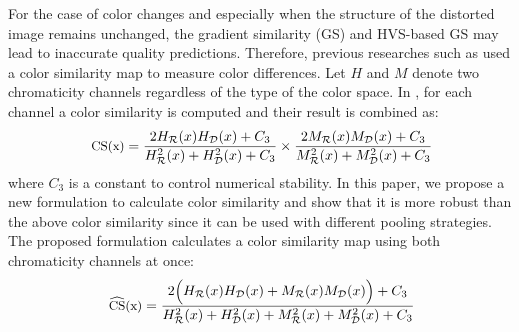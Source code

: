 For the case of color changes and especially when the structure of the distorted image remains unchanged, the gradient similarity (GS) and HVS-based GS may lead to inaccurate quality predictions. Therefore, previous researches such as \cite{FSIM, VSI} used a color similarity map to measure color differences. Let $H$ and $M$ denote two chromaticity channels regardless of the type of the color space. In \cite{FSIM, VSI}, for each channel a color similarity is computed and their result is combined as:
\begin{equation}
\small
  \ \text{CS(x)}=\frac{2 H_\mathcal{R}(x) H_\mathcal{D}(x) + C_3} {H_\mathcal{R}^2(x) + H_\mathcal{D}^2(x) + C_3} \times \frac{2 M_\mathcal{R}(x) M_\mathcal{D}(x) + C_3} {M_\mathcal{R}^2(x) + M_\mathcal{D}^2(x) + C_3}
  \label{CS}
\end{equation}                    
where $C_3$ is a constant to control numerical stability. In this paper, we propose a new formulation to calculate color similarity and show that it is more robust than the above color similarity since it can be used with different pooling strategies. The proposed formulation calculates a color similarity map using both chromaticity channels at once:    
\begin{equation}
\small
  \ \widehat{\text{CS}} \text{(x)} = \frac{2 \Big( H_\mathcal{R}(x) H_\mathcal{D}(x) + M_\mathcal{R}(x) M_\mathcal{D}(x)\Big) + C_3} {H_\mathcal{R}^2(x) + H_\mathcal{D}^2(x) + M_\mathcal{R}^2(x) + M_\mathcal{D}^2(x) + C_3}
  \label{CS}
\end{equation}                    


